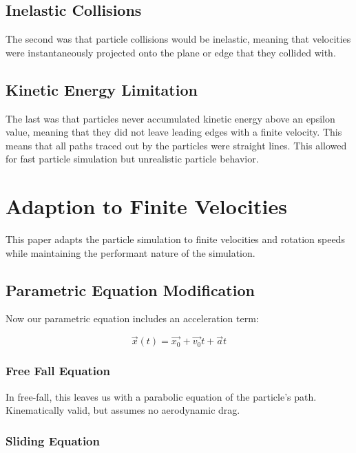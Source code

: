 	\subsection{Inelastic Collisions}
The second was that particle collisions would be inelastic, meaning that velocities were instantaneously projected onto the plane or edge that they collided with.



	\subsection{Kinetic Energy Limitation}

The last was that particles never accumulated kinetic energy above an epsilon value, meaning that they did not leave leading edges with a finite velocity. This means that all paths traced out by the particles were straight lines. This allowed for fast particle simulation but unrealistic particle behavior.

\section{Adaption to Finite Velocities}

This paper adapts the particle simulation to finite velocities and rotation speeds while maintaining the performant nature of the simulation.

	\subsection{Parametric Equation Modification}

Now our parametric equation includes an acceleration term:

$$
\vec{x}(t) = \vec{x_0} + \vec{v_0}t + \vec{a}t
$$

		\subsubsection{Free Fall Equation}
In free-fall, this leaves us with a parabolic equation of the particle's path. Kinematically valid, but assumes no aerodynamic drag.


		\subsubsection{Sliding Equation}

